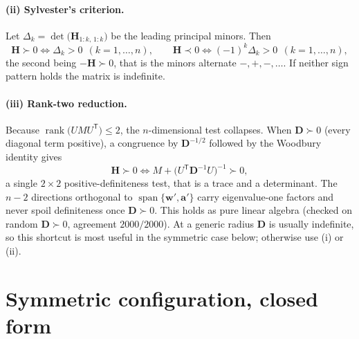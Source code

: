 \documentclass[11pt]{article}
\newcommand{\wv}{\mathbf{w}'}
\newcommand{\av}{\mathbf{a}'}
\newcommand{\tp}{^{\mathsf T}}
\DeclareMathOperator{\rank}{rank}
\begin{document}
\paragraph{(ii) Sylvester's criterion.}
Let $\Delta_k=\det\bigl(\mathbf{H}_{1:k,\,1:k}\bigr)$ be the leading principal minors. Then
\[
\mathbf{H}\succ0 \iff \Delta_k>0\ \ (k=1,\dots,n),
\qquad
\mathbf{H}\prec0 \iff (-1)^k\Delta_k>0\ \ (k=1,\dots,n),
\]
the second being $-\mathbf{H}\succ0$, that is the minors alternate $-,+,-,\dots$. If neither
sign pattern holds the matrix is indefinite.

\paragraph{(iii) Rank-two reduction.}
Because $\rank\bigl(U M U\tp\bigr)\le2$, the $n$-dimensional test collapses. When
$\mathbf{D}\succ0$ (every diagonal term positive), a congruence by $\mathbf{D}^{-1/2}$
followed by the Woodbury identity gives
\[
\mathbf{H}\succ0 \iff M+\bigl(U\tp\mathbf{D}^{-1}U\bigr)^{-1}\succ0,
\]
a single $2\times2$ positive-definiteness test, that is a trace and a determinant. The
$n-2$ directions orthogonal to $\operatorname{span}\{\wv,\av\}$ carry eigenvalue-one factors
and never spoil definiteness once $\mathbf{D}\succ0$. This holds as pure linear algebra
(checked on random $\mathbf{D}\succ0$, agreement $2000/2000$). At a generic radius
$\mathbf{D}$ is usually indefinite, so this shortcut is most useful in the symmetric case
below; otherwise use (i) or (ii).

\section{Symmetric configuration, closed form}
\end{document}
